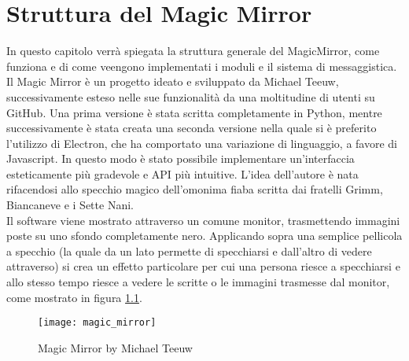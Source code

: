 \chapter{Struttura del Magic Mirror}
In questo capitolo verrà spiegata la struttura generale del MagicMirror, come funziona e di come veengono implementati i
moduli e il sistema di messaggistica.
Il Magic Mirror \`e un progetto ideato e sviluppato da Michael Teeuw, successivamente esteso nelle sue funzionalit\`a da una moltitudine di utenti su GitHub.
Una prima versione \`e stata scritta completamente in Python, mentre successivamente \`e stata creata una seconda versione nella quale si \`e preferito l'utilizzo di Electron,
che ha comportato una variazione di linguaggio, a favore di Javascript. In questo modo \`e stato possibile implementare un'interfaccia esteticamente pi\`u gradevole
e API pi\`u intuitive.
L'idea dell'autore \`e nata rifacendosi allo specchio magico dell'omonima fiaba
scritta dai fratelli Grimm, Biancaneve e i Sette Nani.\\
Il software viene mostrato attraverso un
comune monitor, trasmettendo immagini poste su uno sfondo completamente nero. Applicando sopra
una semplice pellicola a specchio (la quale da un lato permette di specchiarsi e dall'altro di vedere
attraverso) si crea un effetto particolare per cui una persona riesce a specchiarsi
e allo stesso tempo riesce a vedere le scritte o le immagini trasmesse dal monitor,
come mostrato in figura \ref{fig:MM}.
\\[2\baselineskip]
\begin{figure}[H]
    \texttt{[image: magic\_mirror]}
    \caption{Magic Mirror by Michael Teeuw}
    \label{fig:MM}
\end{figure}

